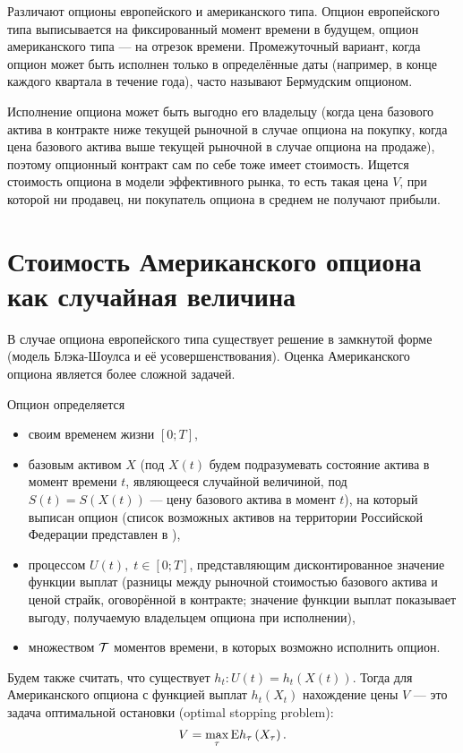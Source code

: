 Различают опционы европейского и американского типа. Опцион европейского типа выписывается на фиксированный момент времени в будущем, опцион американского типа --- на отрезок времени. Промежуточный вариант, когда опцион может быть исполнен только в определённые даты (например, в конце каждого квартала в течение года), часто называют Бермудским опционом.

Исполнение опциона может быть выгодно его владельцу (когда цена базового актива в контракте ниже текущей рыночной в случае опциона на покупку, когда цена базового актива выше текущей рыночной в случае опциона на продаже), поэтому опционный контракт сам по себе тоже имеет стоимость. Ищется стоимость опциона в модели эффективного рынка, то есть такая цена $V$, при которой ни продавец, ни покупатель опциона в среднем не получают прибыли.


\section{Стоимость Американского опциона как случайная величина} %
\label{sec:intro:option_price}

В случае опциона европейского типа существует решение в замкнутой форме (модель Блэка-Шоулса \cite{Black1973} и её усовершенствования). Оценка Американского опциона является более сложной задачей.

Опцион определяется 
\begin{itemize}[noitemsep,topsep=0pt]
\item своим временем жизни $[0;T]$, 
\item базовым активом $X$ (под $X(t)$ будем подразумевать состояние актива в момент времени $t$, являющееся случайной величиной, под $S(t) = S(X(t))$ --- цену базового актива в момент $t$), на который выписан опцион (список возможных активов на территории Российской Федерации представлен в \cite{fsfr}), 
\item процессом $U(t),\;t\in{[0;T]}$, представляющим дисконтированное значение функции выплат (разницы между рыночной стоимостью базового актива и ценой страйк, оговорённой в контракте; значение функции выплат показывает выгоду, получаемую владельцем опциона при исполнении),
\item множеством $\mathcal{T}$ моментов времени, в которых возможно исполнить опцион.
\end{itemize} 
Будем также считать, что существует $h_t: U(t) = h_t\left(X(t)\right)$. Тогда для Американского опциона с функцией выплат $h_t\left(X_t\right)$ нахождение цены $V$ --- это задача оптимальной остановки (optimal stopping problem):
\begin{equation}\label{eq:optimal_stopping}
V = \max_{\tau} \mathrm{E} h_\tau\left(X_\tau\right).
\end{equation}

